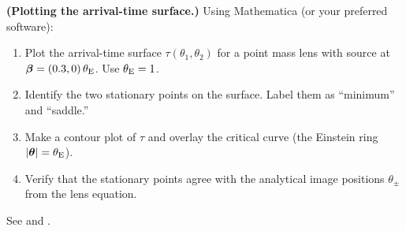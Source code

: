 \begin{exercise}
\label{ex:arrival_surface_plot}
\textbf{(Plotting the arrival-time surface.)}
Using Mathematica (or your preferred software):
\begin{enumerate}[label=(\alph*)]
    \item Plot the arrival-time surface $\tau(\theta_1, \theta_2)$ for a
          point mass lens with source at
          $\boldsymbol{\beta} = (0.3, 0)\,\theta_{\mathrm{E}}$.  Use $\theta_{\mathrm{E}} = 1$.
    \item Identify the two stationary points on the surface.  Label them
          as ``minimum'' and ``saddle.''
    \item Make a contour plot of $\tau$ and overlay the critical curve
          (the Einstein ring $|\boldsymbol{\theta}| = \theta_{\mathrm{E}}$).
    \item Verify that the stationary points agree with the analytical
          image positions $\theta_\pm$ from the lens equation.
\end{enumerate}
See
and
.
\end{exercise}

